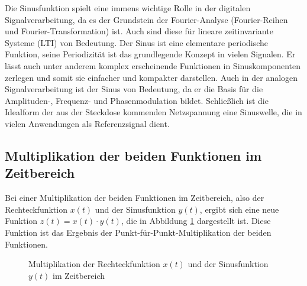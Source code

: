 Die Sinusfunktion spielt eine immens wichtige Rolle in der digitalen Signalverarbeitung, da es der Grundstein der Fourier-Analyse (Fourier-Reihen und Fourier-Transformation) ist. Auch sind diese für lineare zeitinvariante Systeme (LTI) von Bedeutung. 
Der Sinus ist eine elementare periodische Funktion, seine Periodizität ist das grundlegende Konzept in vielen Signalen. Er lässt auch unter anderem komplex erscheinende Funktionen in Sinuskomponenten zerlegen und somit sie einfacher und kompakter darstellen.
Auch in der analogen Signalverarbeitung ist der Sinus von Bedeutung, da er die Basis für die Amplituden-, Frequenz- und Phasenmodulation bildet. Schließlich ist die Idealform der aus der Steckdose kommenden Netzspannung eine Sinuswelle, die in vielen Anwendungen als Referenzsignal dient. 

\subsection{Multiplikation der beiden Funktionen im Zeitbereich}
Bei einer Multiplikation der beiden Funktionen im Zeitbereich, also der Rechteckfunktion $x(t)$ und der Sinusfunktion $y(t)$, ergibt sich eine neue Funktion $z(t) =  x(t) \cdot y(t)$, die in Abbildung \ref{fig:rechteck_sinus} dargestellt ist. Diese Funktion ist das Ergebnis der Punkt-für-Punkt-Multiplikation der beiden Funktionen.
\begin{figure}[H]
    \centering
    \caption{Multiplikation der Rechteckfunktion $x(t)$ und der Sinusfunktion $y(t)$ im Zeitbereich}
    \label{fig:rechteck_sinus}
\end{figure}


